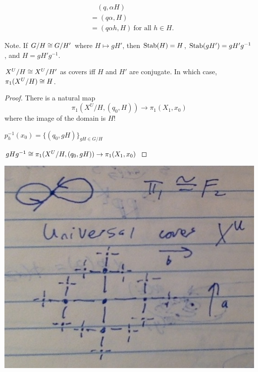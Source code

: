 \documentclass[11pt,leqno,oneside]{amsart}
\numberwithin{thm}{section}
\newcommand{\fund}[1][1]{\pi_{#1}}
\begin{document}
\begin{align}
  &\quad (q, \alpha H) \\
  &=(q\alpha, H) \\
  &=(q\alpha h, H)~\text{for all $h \in H$.}
\end{align}

Note.  If $G/H \mathrel{\cong} G/H'$ where $H \mapsto gH'$, then $\operatorname{Stab}(H) = H$, $\operatorname{Stab}(gH') = gH'g^{-1}$, and $H = gH'g^{-1}$.

\begin{thm}
  $X^U/H \mathrel{\cong} X^U/H'$ as covers iff $H$ and $H'$ are conjugate.  In which case, $\fund[1](X^U/H) \isom H$.
\end{thm}
\begin{proof}
  There is a natural map $$\fund[1](X^U/H, (q_0, H)) \to \fund(X_1, x_0)$$ where the image of the domain is $H$!

  $p_h^{-1}(x_0) = \{ (q_0, gH) \}_{gH \in G/H}$

  $gHg^{-1} \isom \fund(X^U/H, (q_0, gH) ) \to \fund(X_1, x_0)$
\end{proof}

\includegraphics[scale=0.3]{images/universal-cover-f2}
\end{document}
